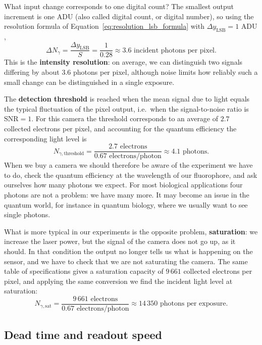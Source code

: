\documentclass[letterpaper,11pt,leqno]{book}
\begin{document}
What input change corresponds to one digital count? The smallest output increment is one ADU (also called digital count, or digital number), so using the resolution formula of Equation~\eqref{eq:resolution_lsb_formula} with $\Delta y_{\text{LSB}} = 1\text{ ADU}$,
\begin{equation}
\Delta N_\gamma = \frac{\Delta y_{\text{LSB}}}{S} = \frac{1}{0.28} \approx 3.6\text{ incident photons per pixel}.
\end{equation}
This is the \textbf{intensity resolution}: on average, we can distinguish two signals differing by about $3.6$ photons per pixel, although noise limits how reliably such a small change can be distinguished in a single exposure.

The \textbf{detection threshold} is reached when the mean signal due to light equals the typical fluctuation of the pixel output, i.e.\ when the signal-to-noise ratio is $\text{SNR} = 1$. For this camera the threshold corresponds to an average of $2.7$ collected electrons per pixel, and accounting for the quantum efficiency the corresponding light level is
\begin{equation}
N_{\gamma,\text{threshold}} = \frac{2.7\text{ electrons}}{0.67\text{ electrons/photon}} \approx 4.1\text{ photons}.
\end{equation}
When we buy a camera we should therefore be aware of the experiment we have to do, check the quantum efficiency at the wavelength of our fluorophore, and ask ourselves how many photons we expect. For most biological applications four photons are not a problem: we have many more. It may become an issue in the quantum world, for instance in quantum biology, where we usually want to see single photons.

What is more typical in our experiments is the opposite problem, \textbf{saturation}: we increase the laser power, but the signal of the camera does not go up, as it should. In that condition the output no longer tells us what is happening on the sensor, and we have to check that we are not saturating the camera. The same table of specifications gives a saturation capacity of $9\,661$ collected electrons per pixel, and applying the same conversion we find the incident light level at saturation:
\begin{equation}
N_{\gamma,\text{sat}} = \frac{9\,661\text{ electrons}}{0.67\text{ electrons/photon}} \approx 14\,350\text{ photons per exposure}.
\end{equation}

\subsection{Dead time and readout speed}
\end{document}
